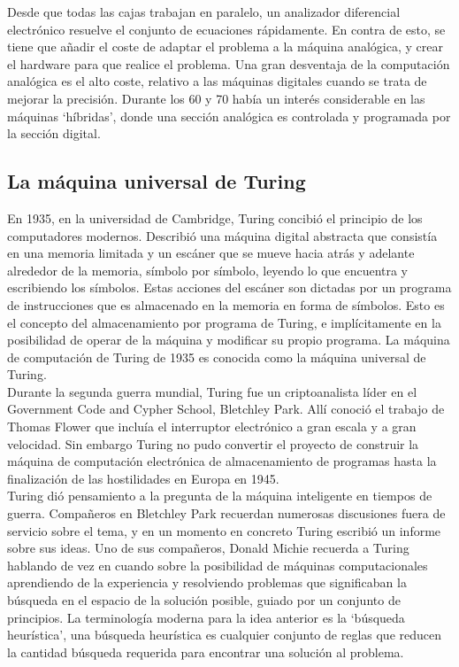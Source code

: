 \documentclass[a4paper]{article}
\begin{document}
    Desde que todas las cajas trabajan en paralelo, un analizador diferencial electrónico resuelve el conjunto de ecuaciones rápidamente. En contra de esto, se tiene que añadir el coste de adaptar el problema a la máquina analógica, y crear el hardware para que realice el problema. Una gran desventaja de la computación analógica es el alto coste, relativo a las máquinas digitales cuando se trata de mejorar la precisión. Durante los 60 y 70 había un interés considerable en las máquinas ‘híbridas’, donde una sección analógica es controlada y programada por la sección digital.

    \subsection*{La máquina universal de Turing}

    En 1935, en la universidad de Cambridge, Turing concibió el principio de los computadores modernos. Describió  una máquina digital abstracta que consistía en una memoria limitada y un escáner que se mueve hacia atrás y adelante alrededor de la memoria, símbolo por símbolo, leyendo lo que encuentra y escribiendo los símbolos. Estas acciones del escáner son dictadas por un programa de instrucciones que es almacenado en la memoria en forma de símbolos. Esto es el concepto del almacenamiento por programa de Turing, e implícitamente  en la posibilidad de operar de la máquina y modificar su propio programa. La máquina de computación de Turing de 1935 es conocida como la máquina universal de Turing.\\

    Durante la segunda guerra mundial, Turing fue un criptoanalista líder en el Government Code and Cypher School, Bletchley Park. Allí conoció el trabajo de Thomas Flower que incluía el interruptor electrónico a gran escala y a gran velocidad. Sin embargo Turing no pudo convertir el proyecto de construir la máquina de computación electrónica de almacenamiento de programas hasta la finalización de las hostilidades en Europa en 1945.\\

    Turing dió pensamiento a la pregunta de la máquina inteligente en tiempos de guerra. Compañeros en Bletchley Park recuerdan numerosas discusiones  fuera de servicio sobre el tema, y en un momento en concreto Turing escribió un informe sobre sus ideas. Uno de sus compañeros, Donald Michie recuerda a Turing hablando de vez en cuando sobre la posibilidad de máquinas computacionales aprendiendo de la experiencia y resolviendo problemas que significaban la búsqueda en el espacio de la solución posible, guiado por un conjunto de principios. La terminología moderna para la idea anterior es la ‘búsqueda heurística’, una búsqueda heurística es cualquier conjunto de reglas que reducen la cantidad búsqueda requerida para encontrar una solución al problema.
\end{document}

